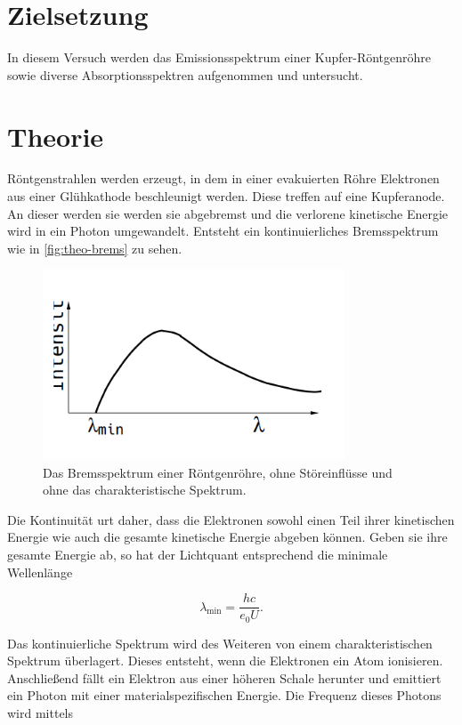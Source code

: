 \section{Zielsetzung}
In diesem Versuch werden das Emissionsspektrum einer Kupfer-Röntgenröhre sowie diverse Absorptionsspektren aufgenommen und untersucht.

\section{Theorie}
\label{sec:Theorie}

Röntgenstrahlen werden erzeugt, in dem in einer evakuierten Röhre Elektronen aus einer Glühkathode beschleunigt werden.
Diese treffen auf eine Kupferanode. An dieser werden sie werden sie abgebremst und die verlorene kinetische Energie wird in ein Photon umgewandelt. Entsteht ein kontinuierliches Bremsspektrum wie in \autoref{fig:theo-brems} zu sehen.

\begin{figure}
    \centering
    \includegraphics[width=0.8\textwidth]{content/bremsspektrum.PNG}
    \caption{Das Bremsspektrum einer Röntgenröhre, ohne Störeinflüsse und ohne das charakteristische Spektrum\cite{V602}.}
    \label{fig:theo-brems}
\end{figure}

Die Kontinuität urt daher, dass die Elektronen sowohl einen Teil ihrer kinetischen Energie wie auch die gesamte kinetische Energie abgeben können.
Geben sie ihre gesamte Energie ab, so hat der Lichtquant entsprechend die minimale Wellenlänge

\begin{equation}
    \label{eqn:lambda-min}
    \lambda_\text{min} = \frac{h c}{e_0 U}.
\end{equation}

Das kontinuierliche Spektrum wird des Weiteren von einem charakteristischen Spektrum überlagert.
Dieses entsteht, wenn die Elektronen ein Atom ionisieren. Anschließend fällt ein Elektron aus einer höheren Schale herunter und emittiert ein Photon mit einer materialspezifischen Energie.
Die Frequenz dieses Photons wird mittels

